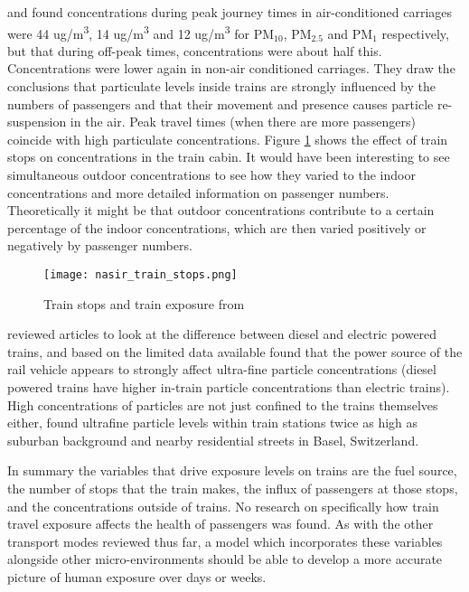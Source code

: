 \cite{Nasir2009} and \cite{Colbeck2010a} found concentrations during peak journey times in air-conditioned carriages were 44 ug/m\textsuperscript{3}, 14 ug/m\textsuperscript{3} and 12 ug/m\textsuperscript{3} for PM$_{10}$, PM$_{2.5}$ and PM$_{1}$ respectively, but that during off-peak times, concentrations were about half this. Concentrations were lower again in non-air conditioned carriages. They draw the conclusions that particulate levels inside trains are strongly influenced by the numbers of passengers and that their movement and presence causes particle re-suspension in the air. Peak travel times (when there are more passengers) coincide with high particulate concentrations. Figure \ref{fig:nasirtrainstops} shows the effect of train stops on concentrations in the train cabin. It would have been interesting to see simultaneous outdoor concentrations to see how they varied to the indoor concentrations and more detailed information on passenger numbers. Theoretically it might be that outdoor concentrations contribute to a certain percentage of the indoor concentrations, which are then varied positively or negatively by passenger numbers.

\begin{figure}[H]
\centering
\texttt{[image: nasir\_train\_stops.png]}
\caption{Train stops and train exposure from \cite{Nasir2009}}
\label{fig:nasirtrainstops}
\end{figure}

\cite{Knibbs2011} reviewed articles to look at the difference between diesel and electric powered trains, and based on the limited data available found that the power source of the rail vehicle appears to strongly affect ultra-fine particle concentrations (diesel powered trains have higher in-train particle concentrations than electric trains). High concentrations of particles are not just confined to the trains themselves either, \cite{Ragettli2013} found ultrafine particle levels within train stations twice as high as suburban background and nearby residential streets in Basel, Switzerland.

In summary the variables that drive exposure levels on trains are the fuel source, the number of stops that the train makes, the influx of passengers at those stops, and the concentrations outside of trains. No research on specifically how train travel exposure affects the health of passengers was found. As with the other transport modes reviewed thus far, a model which incorporates these variables alongside other micro-environments should be able to develop a more accurate picture of human exposure over days or weeks.


